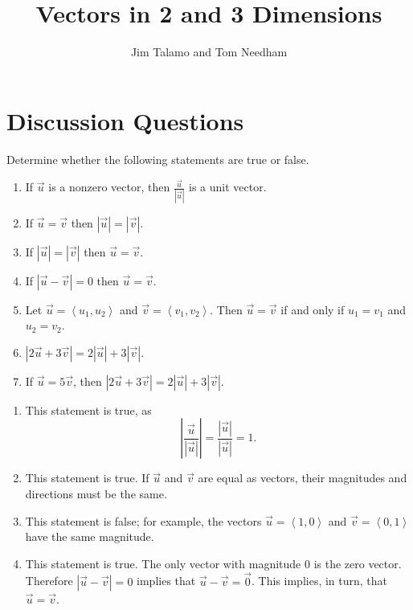 \documentclass[handout,noauthor]{ximera}
\author{Jim Talamo and Tom Needham}
\title[Collaborate:]{Vectors in 2 and 3 Dimensions}
\begin{document}
\begin{abstract}
\end{abstract}
\maketitle

\section{Discussion Questions}

\begin{problem}
Determine whether the following statements are true or false.
\begin{enumerate}[label=(\alph*)]
\item If $\vec{u}$ is a nonzero vector, then $\frac{\vec{u}}{\left|\vec{u}\right|}$ is a unit vector.
\item If $\vec{u} = \vec{v}$ then $\left|\vec{u}\right| = \left|\vec{v}\right|$.
\item If $\left|\vec{u}\right|  = \left|\vec{v}\right|$ then $\vec{u} = \vec{v}$. 
\item If $\left|\vec{u} - \vec{v}\right| = 0$ then $\vec{u} = \vec{v}$.
\item Let $\vec{u} = \left<u_1,u_2\right>$ and $\vec{v}=\left<v_1,v_2\right>$. Then $\vec{u} = \vec{v}$ if and only if $u_1 = v_1$ and $u_2 = v_2$. 
\item $\left|2\vec{u} + 3 \vec{v} \right| = 2 \left|\vec{u}\right| + 3 \left|\vec{v}\right|$. 
\item If $\vec{u} = 5 \vec{v}$, then $\left|2\vec{u} + 3 \vec{v} \right| = 2 \left|\vec{u}\right| + 3 \left|\vec{v}\right|$.
\end{enumerate}
\begin{freeResponse}
\begin{enumerate}[label=(\alph*)]
\item This statement is true, as 
$$
\left| \frac{\vec{u}}{\left|\vec{u}\right|}\right| = \frac{\left|\vec{u}\right|}{\left|\vec{u}\right|} = 1.
$$
\item This statement is true.  If $\vec{u}$ and $\vec{v}$ are equal as vectors, their magnitudes and directions must be the same.
\item This statement is false; for example, the vectors $\vec{u} = \left<1,0\right>$ and $\vec{v} = \left<0,1\right>$ have the same magnitude.
\item This statement is true. The only vector with magnitude $0$ is the zero vector. Therefore $\left|\vec{u} - \vec{v}\right| = 0$ implies that $\vec{u} - \vec{v} = \vec{0}$. This implies, in turn, that $\vec{u} = \vec{v}$.

\end{enumerate}
\end{freeResponse}
\end{problem}
\end{document}
